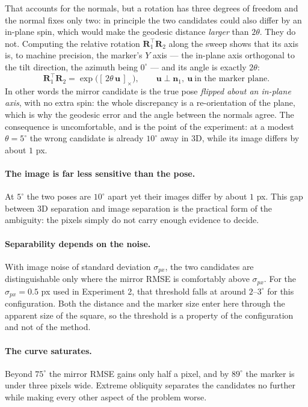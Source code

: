 \documentclass[11pt,a4paper]{article}
\theoremstyle{definition}
\theoremstyle{plain}
\theoremstyle{remark}
\begin{document}
That accounts for the normals, but a rotation has three degrees of freedom and
the normal fixes only two: in principle the two candidates could also differ by
an in-plane spin, which would make the geodesic distance \emph{larger} than
$2\theta$. They do not. Computing the relative rotation
$\mathbf{R}_1^\top\mathbf{R}_2$ along the sweep shows that its axis is, to
machine precision, the marker's $Y$ axis --- the in-plane axis orthogonal to
the tilt direction, the azimuth being $0^\circ$ --- and its angle is exactly
$2\theta$:
\begin{equation}
  \mathbf{R}_1^\top\mathbf{R}_2
  = \exp\!\big([\,2\theta\,\mathbf{u}\,]_\times\big),
  \qquad \mathbf{u}\perp\mathbf{n}_1,\ \mathbf{u}\ \text{in the marker plane}.
\end{equation}
In other words the mirror candidate is the true pose \emph{flipped about an
in-plane axis}, with no extra spin: the whole discrepancy is a re-orientation
of the plane, which is why the geodesic error and the angle between the normals
agree. The consequence is uncomfortable, and is the point of the experiment: at
a modest $\theta=5^\circ$ the wrong candidate is already $10^\circ$ away in 3D,
while its image differs by about $1$ px.

\paragraph{The image is far less sensitive than the pose.} At $5^\circ$ the
two poses are $10^\circ$ apart yet their images differ by about $1$ px. This
gap between 3D separation and image separation is the practical form of the
ambiguity: the pixels simply do not carry enough evidence to decide.

\paragraph{Separability depends on the noise.} With image noise of standard
deviation $\sigma_{px}$, the two candidates are distinguishable only where the
mirror RMSE is comfortably above $\sigma_{px}$. For the $\sigma_{px} = 0.5$ px
used in Experiment 2, that threshold falls at around $2$--$3^\circ$ for this
configuration. Both the distance and the marker size enter here through the
apparent size of the square, so the threshold is a property of the
configuration and not of the method.

\paragraph{The curve saturates.} Beyond $75^\circ$ the mirror RMSE gains only
half a pixel, and by $89^\circ$ the marker is under three pixels wide. Extreme
obliquity separates the candidates no further while making every other aspect
of the problem worse.
\FloatBarrier
\end{document}
